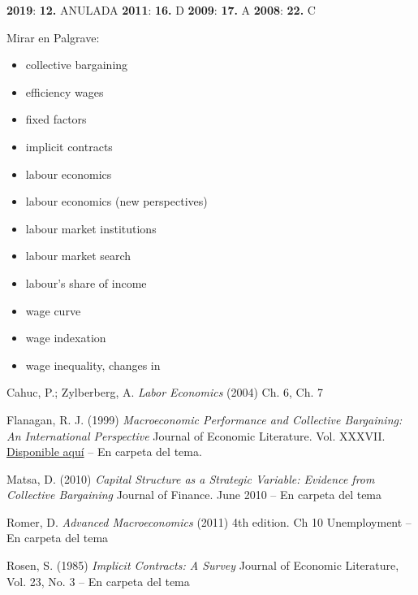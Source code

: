 \documentclass{nuevotema}
\begin{document}
\notas

\textbf{2019}: \textbf{12.} ANULADA
\textbf{2011}: \textbf{16.} D
\textbf{2009}: \textbf{17.} A
\textbf{2008}: \textbf{22.} C

\bibliografia

Mirar en Palgrave:
\begin{itemize}
	\item collective bargaining
	\item efficiency wages
	\item fixed factors
	\item implicit contracts
	\item labour economics
	\item labour economics (new perspectives)
	\item labour market institutions
	\item labour market search
	\item labour's share of income
	\item wage curve
	\item wage indexation
	\item wage inequality, changes in
\end{itemize}

Cahuc, P.; Zylberberg, A. \textit{Labor Economics} (2004) Ch. 6, Ch. 7

Flanagan, R. J. (1999) \textit{Macroeconomic Performance and Collective Bargaining: An International Perspective} Journal of Economic Literature. Vol. XXXVII. \href{https://pubs.aeaweb.org/doi/pdfplus/10.1257/jel.37.3.1150}{Disponible aquí} -- En carpeta del tema. 

Matsa, D. (2010) \textit{Capital Structure as a Strategic Variable: Evidence from Collective Bargaining} Journal of Finance. June 2010 -- En carpeta del tema

Romer, D. \textit{Advanced Macroeconomics} (2011) 4th edition. Ch 10 Unemployment -- En carpeta del tema

Rosen, S. (1985) \textit{Implicit Contracts: A Survey} Journal of Economic Literature, Vol. 23, No. 3 -- En carpeta del tema
\end{document}
